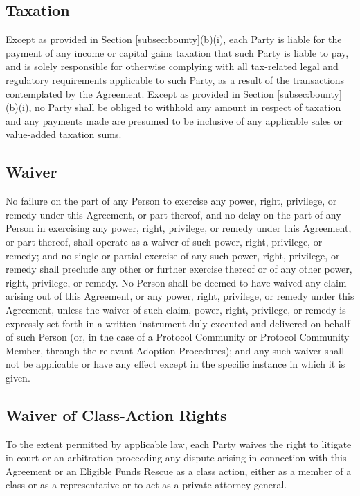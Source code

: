 \documentclass{article}
\begin{document}
\subsection{Taxation}\label{subsec:taxation}

Except as provided in Section \ref{subsec:bounty}(b)(i), each Party is liable for the payment of any income or capital gains taxation that such Party is liable to pay, and is solely responsible for otherwise complying with all tax-related legal and regulatory requirements applicable to such Party, as a result of the transactions contemplated by the Agreement. Except as provided in Section \ref{subsec:bounty}(b)(i), no Party shall be obliged to withhold any amount in respect of taxation and any payments made are presumed to be inclusive of any applicable sales or value-added taxation sums.

\subsection{Waiver}\label{subsec:waiver}

No failure on the part of any Person to exercise any power, right, privilege, or remedy under this Agreement, or part thereof, and no delay on the part of any Person in exercising any power, right, privilege, or remedy under this Agreement, or part thereof, shall operate as a waiver of such power, right, privilege, or remedy; and no single or partial exercise of any such power, right, privilege, or remedy shall preclude any other or further exercise thereof or of any other power, right, privilege, or remedy. No Person shall be deemed to have waived any claim arising out of this Agreement, or any power, right, privilege, or remedy under this Agreement, unless the waiver of such claim, power, right, privilege, or remedy is expressly set forth in a written instrument duly executed and delivered on behalf of such Person (or, in the case of a Protocol Community or Protocol Community Member, through the relevant Adoption Procedures); and any such waiver shall not be applicable or have any effect except in the specific instance in which it is given.

\subsection{Waiver of Class-Action Rights}\label{subsec:waiver_class_action}

To the extent permitted by applicable law, each Party waives the right to litigate in court or an arbitration proceeding any dispute arising in connection with this Agreement or an Eligible Funds Rescue as a class action, either as a member of a class or as a representative or to act as a private attorney general.
\end{document}
